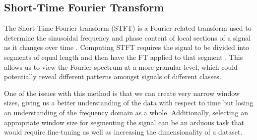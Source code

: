 \documentclass{turabian-thesis}
\begin{document}




\subsection{Short-Time Fourier Transform}
The Short-Time Fourier transform (STFT) is a Fourier related transform used to determine the sinusoidal frequency and phase content of local sections of a signal as it changes over time \cite{hill_uncertainty_nodate}.
Computing STFT requires the signal to be divided into segments of equal length and then have the FT applied to that segment \cite{allen_unified_1977}. This allows us to view the Fourier spectrum at a more granular level, which could potentially reveal different patterns amongst signals of different classes.


One of the issues with this method is that we can create very narrow window sizes, giving us a better understanding of the data with respect to time but losing an understanding of the frequency domain as a whole. Additionally, selecting an appropriate window size for segmenting the signal can be an arduous task that would require fine-tuning as well as increasing the dimensionality of a dataset.
\end{document}
